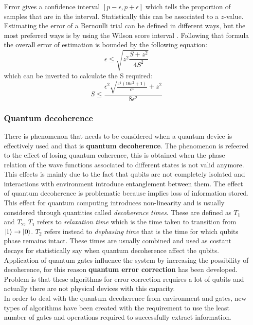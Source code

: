 Error gives a confidence interval $[p-\epsilon, p + \epsilon]$ which tells the proportion of samples that are in the interval. Statistically this can be associated to a $z$-value.
Estimating the error of a Bernoulli trial can be defined in different  ways, but the most preferred ways is by using the Wilson score interval \cite{10.2307/2276774}. Following that formula the overall error of estimation is bounded by the following equation:
\begin{equation*}
	\epsilon \le \sqrt{z^2 \frac{S +z^2}{4S^2}}
\end{equation*}
which can be inverted to calculate the S required:
\begin{equation*}
	S \le \frac{\epsilon^2 \sqrt{\frac{z^4(16\epsilon^2 + 1)}{\epsilon^4}} + z^2}{8\epsilon^2}
\end{equation*}
\subsubsection{Quantum decoherence}
There is phenomenon that needs to be considered when a quantum device is effectively used and that is \textbf{quantum decoherence}. The phenomenon is refeered to the effect of losing quantum coherence, this is obtained when the phase relation of the wave functions associated to different states is not valid anymore. This effects is mainly due to the fact that qubits are not completely isolated and interactions with environment introduce entanglement between them. The effect of quantum decoherence is problematic because implies loss of information stored.\\
This effect for quantum computing introduces non-linearity and is usually considered through quantities called \textit{decoherence times}. These are defined as $T_1$ and $T_2$, $T_1$ refers to \textit{relaxation time} which is the time taken to transition from $\ket{1} \to \ket{0}$. $T_2$ refers instead to \textit{dephasing time} that is the time for which qubits phase remains intact. These times are usually combined and used as costant decays for statistically say when quantum decoherence affect the qubits. Application of quantum gates influence the system by increasing the possibility of decoherence, for this reason \textbf{quantum error correction} has been developed. Problem is that these algorithms for error correction requires a lot of qubits and actually there are not physical devices with this capacity.\\
In order to deal with the quantum decoherence from environment and gates, new types of algorithms have been created with the requirement to use the least number of gates and operations required to successfully extract information.
